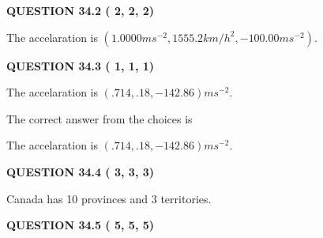 \documentclass[12pt]{article}
\begin{document}
{\textbf{\Large{QUESTION
34.2 
 (          2,          2,          2)
}}}
  
  
 
 
\noindent{}
 
 
The accelaration is
$(
1.0000ms^{-2},
1555.2km/h^2,
-100.00ms^{-2}
).
$
 
 
 
 
  
\vspace{0.2in}
  
{\textbf{\Large{QUESTION
34.3 
 (          1,          1,          1)
}}}
  
  


 
 
\noindent{}
 
 
The accelaration is $  %
(
.714,
.18,
-142.86)
ms^{-2} $.
 
 
 
 
 
 
\noindent{}

The correct answer from the choices is


The accelaration is $  %
(
.714,
.18,
-142.86)
ms^{-2} $.
 
 
 
  
\vspace{0.2in}
  
{\textbf{\Large{QUESTION
34.4 
 (          3,          3,          3)
}}}
  
  
 
 
\noindent{}
 
 
Canada has  %
10 provinces and  %
3 territories.
 
 
 
 
  
\vspace{0.2in}
  
{\textbf{\Large{QUESTION
34.5 
 (          5,          5,          5)
}}}
  
  
 
 
\noindent{}
\end{document}
